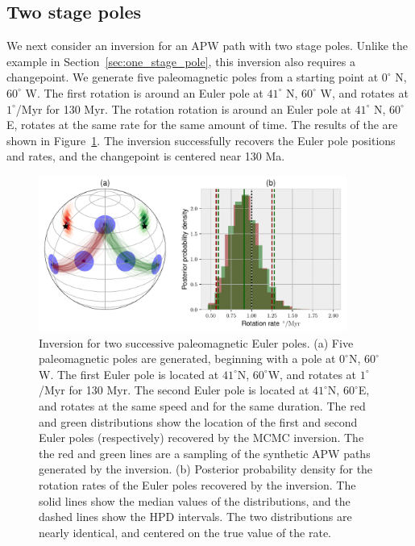 \documentclass[preprint,12pt,authoryear]{elsarticle}
\begin{document}
\subsection{Two stage poles}
\label{sec:two_stage_poles}
We next consider an inversion for an APW path with two stage poles.
Unlike the example in Section~\ref{sec:one_stage_pole}, this inversion also requires a changepoint.
We generate five paleomagnetic poles from a starting point at $0^\circ$ N, $60^\circ$ W.
The first rotation is around an Euler pole at $41^\circ$ N, $60^\circ$ W, and rotates at $1^\circ$/Myr for 130 Myr.
The rotation rotation is around an Euler pole at $41^\circ$ N, $60^\circ$ E, rotates at the same rate for the same amount of time.
The results of the are shown in Figure~\ref{fig:two_euler_poles}.
The inversion successfully recovers the Euler pole positions and rates, and the changepoint is centered near 130 Ma.
\begin{figure}
\includegraphics[width=0.9\textwidth]{figures/synthetic/two_euler_poles.pdf}
\caption[Inversion for two successive paleomagnetic Euler poles.]{Inversion for two successive paleomagnetic Euler poles. (a) Five paleomagnetic poles are generated, beginning with a pole at $0^\circ$N, $60^\circ$W. The first Euler pole is located at $41^\circ$N, $60^\circ$W, and rotates at $1^\circ$/Myr for 130 Myr. The second Euler pole is located at $41^\circ$N, $60^\circ$E, and rotates at the same speed and for the same duration. The red and green distributions show the location of the first and second Euler poles (respectively) recovered by the MCMC inversion. The the red and green lines are a sampling of the synthetic APW paths generated by the inversion. (b) Posterior probability density for the rotation rates of the Euler poles recovered by the inversion. The solid lines show the median values of the distributions, and the dashed lines show the HPD intervals. The two distributions are nearly identical, and centered on the true value of the rate.}
\label{fig:two_euler_poles}
\end{figure}
\end{document}
